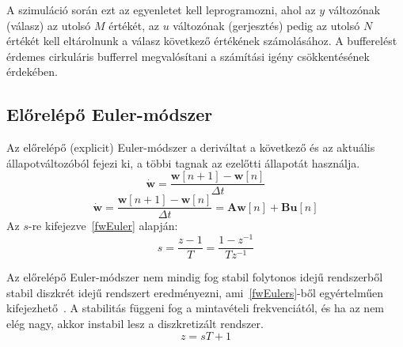 A szimuláció során ezt az egyenletet kell leprogramozni, ahol az $y$ változónak (válasz) az utolsó $M$ értékét, az $u$ változónak (gerjesztés) pedig az utolsó $N$ értékét kell eltárolnunk a válasz következő értékének számolásához. A bufferelést érdemes cirkuláris bufferrel megvalósítani a számítási igény csökkentésének érdekében. 

\subsection{Előrelépő Euler-módszer}\label{fwEulerSection}

Az előrelépő (explicit) Euler-módszer a deriváltat a következő és az aktuális állapotváltozóból fejezi ki, a többi tagnak
az ezelőtti állapotát használja.
\begin{equation}
    \mathbf{\dot{w}}=\frac{\mathbf{w}[n+1]-\mathbf{w}[n]}{\Delta{}t}
\label{fwEuler}
\end{equation}
\begin{equation}
    \mathbf{\dot{w}}=\frac{\mathbf{w}[n+1]-\mathbf{w}[n]}{\Delta{}t}=\mathbf{A}\mathbf{w}[n]+\mathbf{Bu}[n]
\end{equation}
Az $s$-re kifejezve~\ref{fwEuler} alapján:
\begin{equation}
    s=\frac{z-1}{T}=\frac{1-z^{-1}}{Tz^{-1}}
\label{fwEulers}
\end{equation}

Az előrelépő Euler-módszer nem mindig fog stabil folytonos idejű rendszerből stabil diszkrét idejű rendszert 
eredményezni, ami~\ref{fwEulers}-ből egyértelműen kifejezhető~\cite{transformations}. A stabilitás függeni fog a mintavételi frekvenciától, és ha az nem elég nagy, akkor instabil lesz a diszkretizált rendszer.
\begin{equation}
    z=sT+1
\end{equation}

